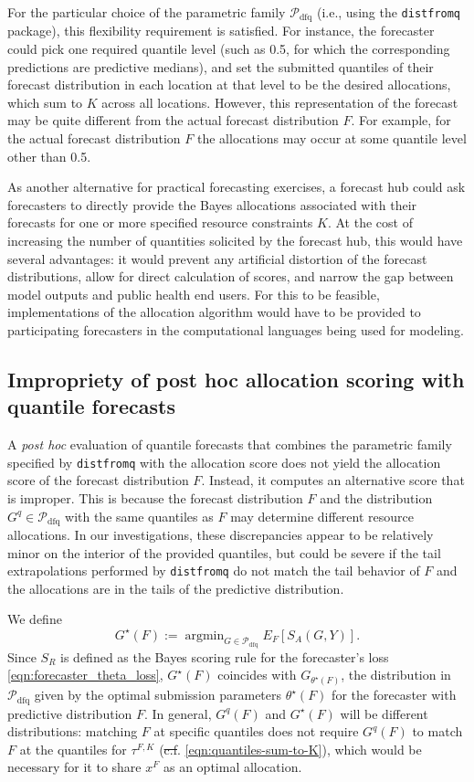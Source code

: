 \documentclass{article}\usepackage[]{graphicx}\usepackage[]{xcolor}
\DeclareMathOperator*{\argmin}{argmin}
\providecommand{\DIFaddtex}[1]{{\protect\color{blue}\uwave{#1}}} %
\providecommand{\DIFdeltex}[1]{{\protect\color{red}\sout{#1}}}                      %
\providecommand{\DIFaddbegin}{} %
\providecommand{\DIFaddend}{} %
\providecommand{\DIFdelbegin}{} %
\providecommand{\DIFdelend}{} %
\providecommand{\DIFadd}[1]{\texorpdfstring{\DIFaddtex{#1}}{#1}} %
\providecommand{\DIFdel}[1]{\texorpdfstring{\DIFdeltex{#1}}{}} %
\newcommand{\DIFscaledelfig}{0.5}
\newlength{\DIFdelgraphicswidth} %
\newlength{\DIFdelgraphicsheight} %
\newcommand{\DIFaddincludegraphics}[2][]{{\color{blue}\fbox{\DIFOincludegraphics[#1]{#2}}}} %
\newcommand{\DIFdelincludegraphics}[2][]{%
\sbox{\DIFdelgraphicsbox}{\DIFOincludegraphics[#1]{#2}}%
\settoboxwidth{\DIFdelgraphicswidth}{\DIFdelgraphicsbox} %
\settoboxtotalheight{\DIFdelgraphicsheight}{\DIFdelgraphicsbox} %
\scalebox{\DIFscaledelfig}{%
\parbox[b]{\DIFdelgraphicswidth}{\usebox{\DIFdelgraphicsbox}\\[-\baselineskip] \rule{\DIFdelgraphicswidth}{0em}}\llap{\resizebox{\DIFdelgraphicswidth}{\DIFdelgraphicsheight}{%
\setlength{\unitlength}{\DIFdelgraphicswidth}%
\begin{picture}(1,1)%
\thicklines\linethickness{2pt} %
{\color[rgb]{1,0,0}\put(0,0){\framebox(1,1){}}}%
{\color[rgb]{1,0,0}\put(0,0){\line( 1,1){1}}}%
{\color[rgb]{1,0,0}\put(0,1){\line(1,-1){1}}}%
\end{picture}%
}\hspace*{3pt}}} %
} %
\DeclareRobustCommand{\DIFaddbegin}{\DIFOaddbegin \let\includegraphics\DIFaddincludegraphics} %
\DeclareRobustCommand{\DIFaddend}{\DIFOaddend \let\includegraphics\DIFOincludegraphics} %
\DeclareRobustCommand{\DIFdelbegin}{\DIFOdelbegin \let\includegraphics\DIFdelincludegraphics} %
\DeclareRobustCommand{\DIFdelend}{\DIFOaddend \let\includegraphics\DIFOincludegraphics} %
\begin{document}
For the particular choice of the parametric family $\mathcal{P}_{\text{dfq}}$ (i.e., using the \verb`distfromq`
package), this flexibility requirement is satisfied. For instance, the forecaster could pick one required quantile level
(such as 0.5, for which the corresponding predictions are predictive medians), and set the submitted quantiles of their
forecast distribution in each location at that level to be the desired allocations, which sum to $K$ across all
locations. However, this representation of the forecast may be quite different from the actual forecast distribution
$F$. For example, for the actual forecast distribution $F$ the allocations may occur at some quantile level other than
0.5.

As another alternative for practical forecasting exercises, a forecast hub could ask forecasters to directly provide the
Bayes allocations associated with their forecasts for one or more specified resource constraints $K$. At the cost of
increasing the number of quantities solicited by the forecast hub, this would have several advantages: it would prevent
any artificial distortion of the forecast distributions, allow for direct calculation of scores, and narrow the gap
between model outputs and public health end users. For this to be feasible, implementations of the allocation algorithm
would have to be provided to participating forecasters in the computational languages being used for modeling.

\subsection{Impropriety of post hoc allocation scoring with quantile forecasts}

A \emph{post hoc} evaluation of quantile forecasts that combines the parametric family specified by \verb`distfromq`
with the allocation score does not yield the allocation score of the forecast distribution $F$. Instead, it computes an
alternative score that is improper. This is because the forecast distribution $F$ and the distribution $G^q \in
\mathcal{P}_{\text{dfq}}$ with the same quantiles as $F$ may determine different resource allocations. In our
investigations, these discrepancies appear to be relatively minor on the interior of the provided quantiles, but could
be severe if the tail extrapolations performed by \verb`distfromq` do not match the tail behavior of $F$ and the
allocations are in the tails of the predictive distribution.

We define
$$G^{\star}(F) := \argmin_{G \in \mathcal{P}_{\mathrm{dfq}}} E_{F}[S_A(G, Y)].$$
Since $S_R$ is defined as the Bayes scoring rule for the forecaster's loss \eqref{eqn:forecaster_theta_loss}, $G^{\star}(F)$ coincides
with $G_{\theta^{\star}(F)}$, the distribution in $\mathcal{P}_{\mathrm{dfq}}$ given by the
optimal submission parameters $\theta^{\star}(F)$ for the forecaster with predictive distribution $F$.
In general, $G^q(F)$ and $G^\star(F)$ will be different distributions:  matching $F$ at specific quantiles
does not require $G^q(F)$ to match $F$ at the quantiles for $\tau^{F,K}$ (\DIFdelbegin \DIFdel{c.f}\DIFdelend \DIFaddbegin \DIFadd{cf}\DIFaddend . \eqref{eqn:quantiles-sum-to-K}),
which would be necessary for it to share $x^F$ as an optimal allocation.
\end{document}
